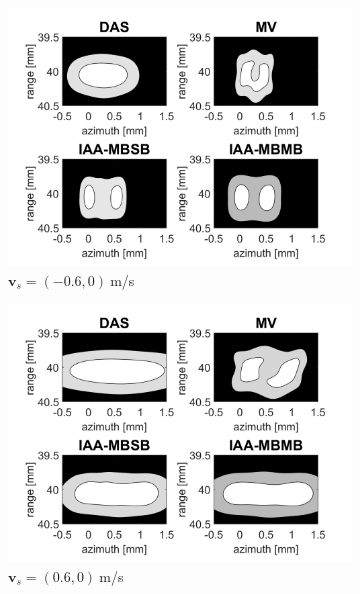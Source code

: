 \begin{figure}[ht]
    \centering
    \begin{subfigure}[t]{0.48\linewidth}
        \includegraphics[width=\linewidth]{./images/results/2.2/motion_0_-06.png}
        \caption{$\boldsymbol{v}_s = (-0.6, 0)~$m/s}
    \end{subfigure}
    \quad
    \begin{subfigure}[t]{0.48\linewidth}
        \includegraphics[width=\linewidth]{./images/results/2.2/motion_0_06.png}
        \caption{$\boldsymbol{v}_s = (0.6, 0)~$m/s}
        \label{fig:double_lateral}
    \end{subfigure}
    \quad
    \begin{subfigure}[t]{0.48\linewidth}

\end{subfigure}
\end{figure}
